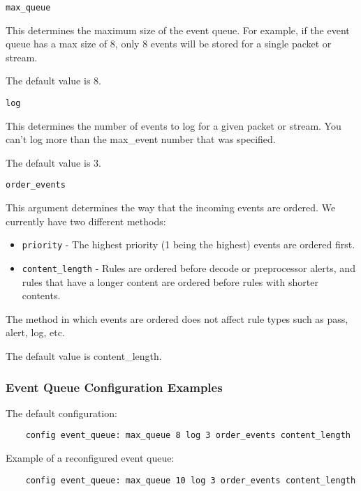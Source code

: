 \documentclass[english]{report}
\newcounter{slistnum}
\newenvironment{slist}
{ \begin{list}{ {\bf \arabic{slistnum}.} }{\usecounter{slistnum} } }
{ \end{list} }
\begin{document}
\begin{slist}
\item \texttt{max\_queue}

This determines the maximum size of the event queue.  For example, if the event
queue has a max size of 8, only 8 events will be stored for a single packet or
stream.

The default value is 8.

\item \texttt{log}

This determines the number of events to log for a given packet or stream.  You
can't log more than the max\_event number that was specified.

The default value is 3.

\item \texttt{order\_events}

This argument determines the way that the incoming events are ordered.  We
currently have two different methods:

\begin{itemize}

\item \texttt{priority} - The highest priority (1 being the highest) events are
ordered first.

\item \texttt{content\_length} - Rules are ordered before decode or
preprocessor alerts, and rules that have a longer content are ordered before
rules with shorter contents.

\end{itemize}

The method in which events are ordered does not affect rule types such as pass,
alert, log, etc.

The default value is content\_length.
\end{slist}

\subsubsection{Event Queue Configuration Examples}

The default configuration:

\begin{verbatim}
    config event_queue: max_queue 8 log 3 order_events content_length
\end{verbatim}

Example of a reconfigured event queue:

\begin{verbatim}
    config event_queue: max_queue 10 log 3 order_events content_length
\end{verbatim}
\end{document}
